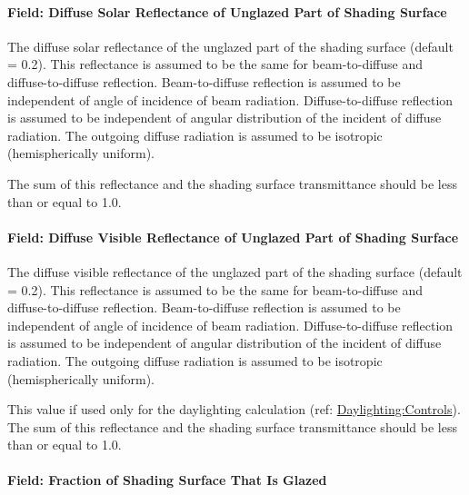 \paragraph{Field: Diffuse Solar Reflectance of Unglazed Part of Shading Surface}\label{field-diffuse-solar-reflectance-of-unglazed-part-of-shading-surface}

The diffuse solar reflectance of the unglazed part of the shading surface (default = 0.2). This reflectance is assumed to be the same for beam-to-diffuse and diffuse-to-diffuse reflection. Beam-to-diffuse reflection is assumed to be independent of angle of incidence of beam radiation. Diffuse-to-diffuse reflection is assumed to be independent of angular distribution of the incident of diffuse radiation. The outgoing diffuse radiation is assumed to be isotropic (hemispherically uniform).

The sum of this reflectance and the shading surface transmittance should be less than or equal to 1.0.

\paragraph{Field: Diffuse Visible Reflectance of Unglazed Part of Shading Surface}\label{field-diffuse-visible-reflectance-of-unglazed-part-of-shading-surface}

The diffuse visible reflectance of the unglazed part of the shading surface (default = 0.2). This reflectance is assumed to be the same for beam-to-diffuse and diffuse-to-diffuse reflection. Beam-to-diffuse reflection is assumed to be independent of angle of incidence of beam radiation. Diffuse-to-diffuse reflection is assumed to be independent of angular distribution of the incident of diffuse radiation. The outgoing diffuse radiation is assumed to be isotropic (hemispherically uniform).

This value if used only for the daylighting calculation (ref: \hyperref[daylightingcontrols-000]{Daylighting:Controls}). The sum of this reflectance and the shading surface transmittance should be less than or equal to 1.0.

\paragraph{Field: Fraction of Shading Surface That Is Glazed}\label{field-fraction-of-shading-surface-that-is-glazed}

